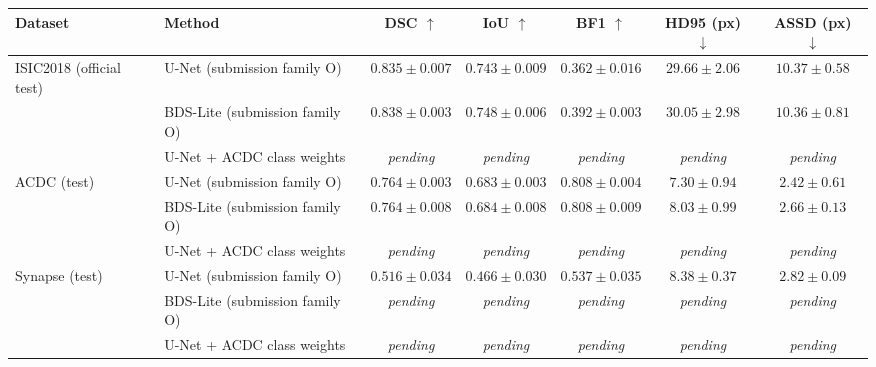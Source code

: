 \begin{tabular}{llccccc}
\toprule
Dataset & Method & DSC $\uparrow$ & IoU $\uparrow$ & BF1 $\uparrow$ & HD95 (px) $\downarrow$ & ASSD (px) $\downarrow$ \\
\midrule
ISIC2018 (official test) & U-Net (submission family O) & $0.835 \pm 0.007$ & $0.743 \pm 0.009$ & $0.362 \pm 0.016$ & $29.66 \pm 2.06$ & $10.37 \pm 0.58$ \\
 & BDS-Lite (submission family O) & $0.838 \pm 0.003$ & $0.748 \pm 0.006$ & $0.392 \pm 0.003$ & $30.05 \pm 2.98$ & $10.36 \pm 0.81$ \\
 & U-Net + ACDC class weights & \textit{pending} & \textit{pending} & \textit{pending} & \textit{pending} & \textit{pending} \\
\midrule
ACDC (test) & U-Net (submission family O) & $0.764 \pm 0.003$ & $0.683 \pm 0.003$ & $0.808 \pm 0.004$ & $7.30 \pm 0.94$ & $2.42 \pm 0.61$ \\
 & BDS-Lite (submission family O) & $0.764 \pm 0.008$ & $0.684 \pm 0.008$ & $0.808 \pm 0.009$ & $8.03 \pm 0.99$ & $2.66 \pm 0.13$ \\
 & U-Net + ACDC class weights & \textit{pending} & \textit{pending} & \textit{pending} & \textit{pending} & \textit{pending} \\
\midrule
Synapse (test) & U-Net (submission family O) & $0.516 \pm 0.034$ & $0.466 \pm 0.030$ & $0.537 \pm 0.035$ & $8.38 \pm 0.37$ & $2.82 \pm 0.09$ \\
 & BDS-Lite (submission family O) & \textit{pending} & \textit{pending} & \textit{pending} & \textit{pending} & \textit{pending} \\
 & U-Net + ACDC class weights & \textit{pending} & \textit{pending} & \textit{pending} & \textit{pending} & \textit{pending} \\
\bottomrule
\end{tabular}
